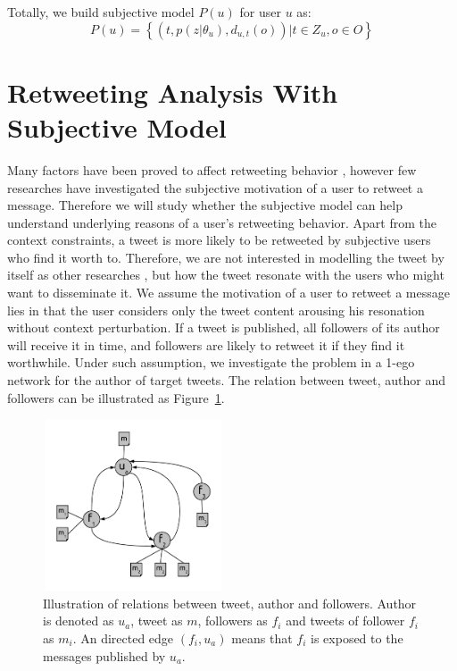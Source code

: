 \documentclass[letterpaper]{article}
\begin{document}
Totally, we build subjective model $ P\left( u \right) $ for user $ u $ as:
\begin{equation}
\label{subuser}
P\left( u \right)= \left\lbrace \left( t, p\left( z \vert \theta_{u} \right), d_{u,t}\left( o \right) \right)  \vert t \in Z_{u}, o \in O  \right\rbrace  
\end{equation}

\section{Retweeting Analysis With Subjective Model}

Many factors have been proved to affect retweeting behavior \cite{Suh2010,conf/icwsm/MacskassyM11,Comarela:2012UFA}, however few researches have investigated the subjective motivation of a user to retweet a message. 
Therefore we will study whether the subjective model can help understand underlying reasons of a user's retweeting behavior.
Apart from the context constraints, a tweet is more likely to be retweeted by subjective users who find it worth to. 
Therefore, we are not interested in modelling the tweet by itself as other researches \cite{Naveed:2011SMC,2011:NaveedGKC,conf/icwsm/PfitznerGS12}, but how the tweet resonate with the users who might want to disseminate it. 
We assume the motivation of a user to retweet a message lies in that the user considers only the tweet content arousing his resonation without context perturbation. 
If a tweet is published, all followers of its author will receive it in time, and followers are likely to retweet it if they find it worthwhile. 
Under such assumption, we investigate the problem in a 1-ego network for the author of target tweets. 
The relation between tweet, author and followers can be illustrated as Figure~\ref{fig1}.
\begin{figure}[htb]
\centering
\includegraphics[width=2.1in,height=2.0in]{ego.pdf}
\caption{Illustration of relations between tweet, author and followers. Author is denoted as $ u_{a} $, tweet as $ m $, followers as $ f_{i} $ and tweets of follower $ f_{i} $ as $ m_{i} $. An directed edge $ \left( f_{i},u_{a} \right)  $ means that $ f_{i} $ is exposed to the messages published by $ u_{a} $.}
\label{fig1}
\end{figure}
\end{document}
